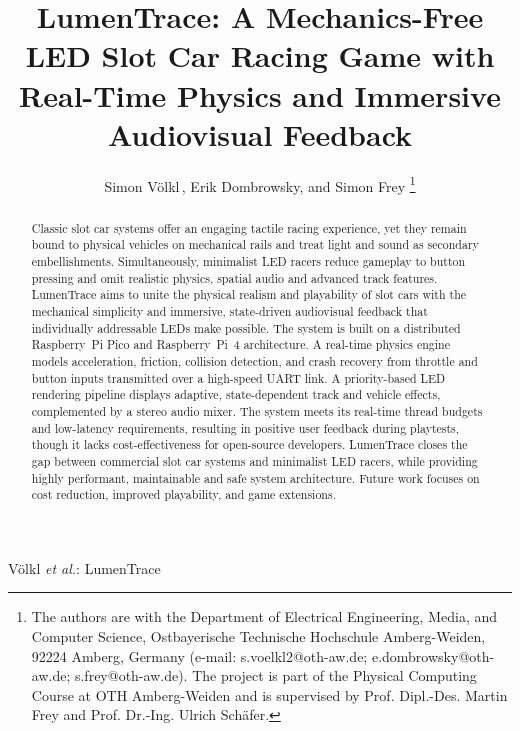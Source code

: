 \documentclass[10pt,journal,final,a4paper]{IEEEtran}
\begin{document}
\title{LumenTrace: A Mechanics-Free LED Slot Car Racing Game with Real-Time Physics and Immersive Audiovisual Feedback} 

\author{Simon Völkl\,, 
        Erik Dombrowsky, 
        and Simon Frey%
\thanks{The authors are with the Department of Electrical Engineering, Media, and Computer Science, Ostbayerische Technische Hochschule Amberg-Weiden, 92224 Amberg, Germany (e-mail: s.voelkl2@oth-aw.de; e.dombrowsky@oth-aw.de; s.frey@oth-aw.de). The project is part of the Physical Computing Course at OTH Amberg-Weiden and is supervised by Prof. Dipl.-Des. Martin Frey and Prof. Dr.-Ing. Ulrich Schäfer.}%
}

{Völkl \MakeLowercase{\textit{et al.}}: LumenTrace}

\maketitle

\begin{abstract}
    Classic slot car systems offer an engaging tactile racing experience, yet they remain bound to physical vehicles on mechanical rails and treat light and sound as secondary embellishments. Simultaneously, minimalist LED racers reduce gameplay to button pressing and omit realistic physics, spatial audio and advanced track features.
    LumenTrace aims to unite the physical realism and playability of slot cars with the mechanical simplicity and immersive, state-driven audiovisual feedback that individually addressable LEDs make possible.
    The system is built on a distributed Raspberry~Pi Pico and Raspberry~Pi~4 architecture. A real-time physics engine models acceleration, friction, collision detection, and crash recovery from throttle and button inputs transmitted over a high-speed UART link. A priority-based LED rendering pipeline displays adaptive, state-dependent track and vehicle effects, complemented by a stereo audio mixer.
    The system meets its real-time thread budgets and low-latency requirements, resulting in positive user feedback during playtests, though it lacks cost-effectiveness for open-source developers. 
    LumenTrace closes the gap between commercial slot car systems and minimalist LED racers, while providing highly performant, maintainable and safe system architecture. Future work focuses on cost reduction, improved playability, and game extensions.
\end{abstract}
\end{document}
